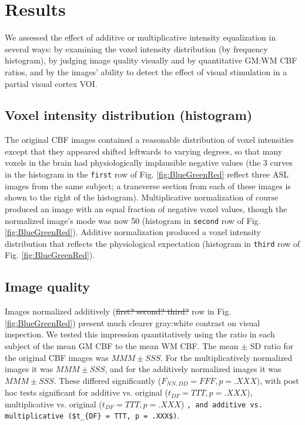\section{Results}
We assessed the effect of additive or multiplicative intensity equalization in several ways: by examining the voxel intensity distribution (by frequency histogram), by judging image quality visually and by quantitative GM:WM CBF ratios, and by the images' ability to detect the effect of visual stimulation in a partial visual cortex VOI. 

\subsection{Voxel intensity distribution (histogram)}
The original CBF images contained a reasonable distribution of voxel intensities except that they appeared shifted leftwards to varying degrees, so that many voxels in the brain had physiologically implausible negative values (the 3 curves in the histogram in the \verb|first| row of Fig. \ref{fig:BlueGreenRed} reflect three ASL images from the same subject; a transverse section from each of these images is shown to the right of the histogram). Multiplicative normalization of course produced an image with an equal fraction of negative voxel values, though the normalized image's mode was now 50 (histogram in \verb|second| row of Fig. \ref{fig:BlueGreenRed}). Additive normalization produced a voxel intensity distribution that reflects the physiological expectation (histogram in \verb|third| row of Fig. \ref{fig:BlueGreenRed}). 

\subsection{Image quality}
Images normalized additively (\sout{first? second? third?} row in Fig. \ref{fig:BlueGreenRed}) present much clearer gray:white contrast on visual inspection. We tested this impression quantitatively using the ratio in each subject of the mean GM CBF to the mean WM CBF. The mean $\pm$ SD ratio for the original CBF images was $MMM \pm SSS$. For the multiplicatively normalized images it was $MMM \pm SSS$, and for the additively normalized images it was $MMM \pm SSS$. These differed significantly ($F_{NN,DD} = FFF, p = .XXX$), with post hoc tests significant for additive vs. original ($t_{DF} = TTT, p = .XXX$), multiplicative vs. original ($t_{DF} = TTT, p = .XXX$) \verb|, and additive vs. multiplicative ($t_{DF} = TTT, p = .XXX$)|.

